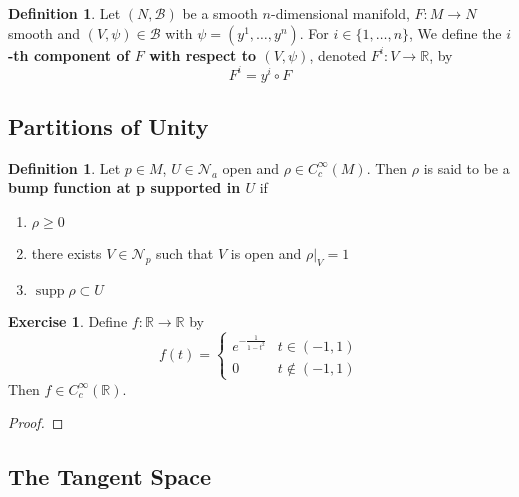 \documentclass[12pt]{amsart}
\theoremstyle{definition}
\newtheorem{defn}[definition]{Definition}
\newtheorem{ex}[definition]{Exercise}
\newcommand{\R}{\mathbb{R}}
\newcommand{\MB}{\mathcal{B}}
\newcommand{\MN}{\mathcal{N}}
\DeclareMathOperator{\supp}{supp}
\begin{document}
	\begin{defn}
		Let $(N, \MB)$ be a smooth  $n$-dimensional manifold, $F: M \rightarrow N$ smooth and $(V, \psi) \in \MB$ with $\psi = (y^1, \dots, y^n)$. For $i \in \{1, \dots, n\}$, We define the \textbf{$i$-th component of $F$ with respect to $(V, \psi)$},  denoted $F^i: V \rightarrow \R$, by $$F^i = y^i \circ F$$  
	\end{defn}

	











\newpage 
\subsection{Partitions of Unity}
	
	\begin{defn}
	Let $p \in M$, $U \in \MN_a$ open and $\rho \in C_c^{\infty}(M)$. Then $\rho$ is said to be a \textbf{bump function at p supported in $U$} if 
	\begin{enumerate}
	\item $\rho \geq 0$ 
	\item there exists $V \in \MN_p$ such that $V$ is open and $\rho|_V = 1$ 
	\item $\supp \rho \subset U$
	\end{enumerate}
	\end{defn}
	
	\begin{ex}
	Define $f:\R \rightarrow \R$ by 
	\[
	f(t) = 
	\begin{cases}
	e^{-\frac{1}{1-t^2}} & t \in (-1,1)\\
	0 &  t \not \in (-1,1)
	\end{cases}
	\]
	Then $f \in C_c^{\infty}(\R)$.
	\end{ex}
	
	\begin{proof}
	
	\end{proof}
	
	
















	\newpage
	\subsection{The Tangent Space}
\end{document}
